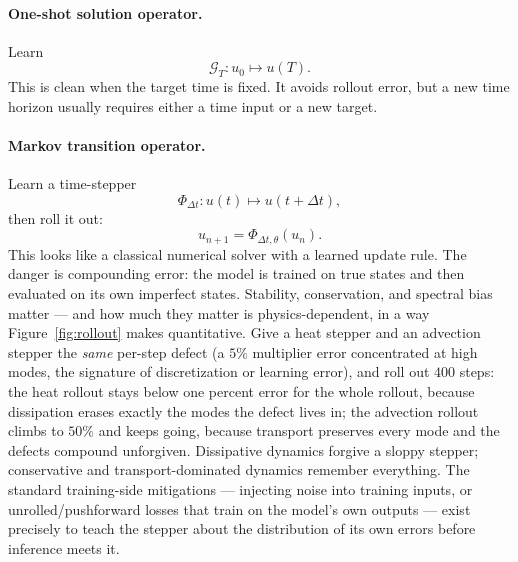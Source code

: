 \documentclass[10pt,a4paper]{article}
\newcommand{\G}{\mathcal{G}}
\begin{document}
\paragraph{One-shot solution operator.}
Learn
\[
  \G_T : u_0 \mapsto u(T).
\]
This is clean when the target time is fixed. It avoids rollout error, but a
new time horizon usually requires either a time input or a new target.

\paragraph{Markov transition operator.}
Learn a time-stepper
\[
  \Phi_{\Delta t} : u(t) \mapsto u(t+\Delta t),
\]
then roll it out:
\[
  u_{n+1} = \Phi_{\Delta t,\theta}(u_n).
\]
This looks like a classical numerical solver with a learned update rule.
The danger is compounding error: the model is trained on true states and then
evaluated on its own imperfect states. Stability, conservation, and spectral
bias matter --- and how much they matter is physics-dependent, in a way
Figure~\ref{fig:rollout} makes quantitative. Give a heat stepper and an
advection stepper the \emph{same} per-step defect (a $5\%$ multiplier
error concentrated at high modes, the signature of discretization or
learning error), and roll out $400$ steps: the heat rollout stays below
one percent error for the whole rollout, because dissipation erases exactly the modes
the defect lives in; the advection rollout climbs to $50\%$ and keeps
going, because transport preserves every mode and the defects compound
unforgiven. Dissipative dynamics forgive a sloppy stepper; conservative
and transport-dominated dynamics remember everything. The standard
training-side mitigations --- injecting noise into training inputs, or
unrolled/pushforward losses that train on the model's own outputs ---
exist precisely to teach the stepper about the distribution of its own
errors before inference meets it.
\end{document}
